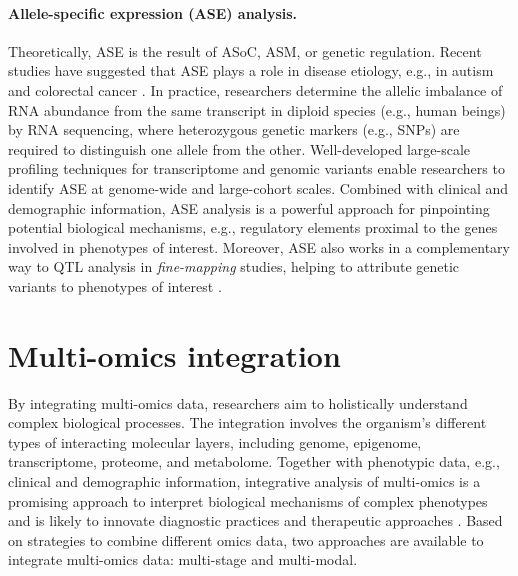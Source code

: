 \documentclass{book}
\begin{document}
\begin{refsection}
\paragraph*{Allele-specific expression (ASE) analysis.} Theoretically, ASE is the result of ASoC, ASM, or genetic regulation.
Recent studies have suggested that ASE plays a role in disease etiology, e.g., in autism \cite{Lee2019Profiling} and colorectal cancer \cite{Valle2008Germline}.
In practice, researchers determine the allelic imbalance of RNA abundance from the same transcript in diploid species (e.g., human beings) by RNA sequencing, where heterozygous genetic markers (e.g., SNPs) are required to distinguish one allele from the other.
Well-developed large-scale profiling techniques for transcriptome and genomic variants enable researchers to identify ASE at genome-wide and large-cohort scales.
Combined with clinical and demographic information, ASE analysis is a powerful approach for pinpointing potential biological mechanisms, e.g., regulatory elements proximal to the genes involved in phenotypes of interest.
Moreover, ASE also works in a complementary way to QTL analysis in \textit{fine-mapping} studies, helping to attribute genetic variants to phenotypes of interest \cite{Kumasaka2015Fine,Wang2020Allele,Zou2019Leveraging}.


\section*{Multi-omics integration}
By integrating multi-omics data, researchers aim to holistically understand complex biological processes.
The integration involves the organism’s different types of interacting molecular layers, including genome, epigenome, transcriptome, proteome, and metabolome.
Together with phenotypic data, e.g., clinical and demographic information, integrative analysis of multi-omics is a promising approach to interpret biological mechanisms of complex phenotypes and is likely to innovate diagnostic practices and therapeutic approaches \cite{Yan2017Network}.
Based on strategies to combine different omics data, two approaches are available to integrate multi-omics data: multi-stage and multi-modal.%


\end{refsection}
\end{document}
